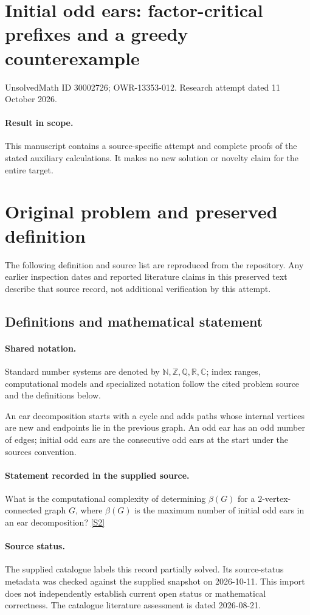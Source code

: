 \documentclass[11pt]{article}
\begin{document}
\section*{Initial odd ears: factor-critical prefixes and a greedy counterexample}
\noindent UnsolvedMath ID 30002726; OWR-13353-012. Research attempt dated 11 October 2026.
\paragraph{Result in scope.}This manuscript contains a source-specific attempt and complete proofs of the stated auxiliary calculations. It makes no new solution or novelty claim for the entire target.
\section{Original problem and preserved definition}
The following definition and source list are reproduced from the repository. Any earlier inspection dates and reported literature claims in this preserved text describe that source record, not additional verification by this attempt.
\subsection{Definitions and mathematical statement}

\paragraph{Shared notation.}Standard number systems are denoted by $\mathbb N,\mathbb Z,\mathbb Q,\mathbb R,\mathbb C$; index ranges, computational models and specialized notation follow the cited problem source and the definitions below.


An ear decomposition starts with a cycle and adds paths whose internal vertices are new and endpoints lie in the previous graph. An odd ear has an odd number of edges; initial odd ears are the consecutive odd ears at the start under the source\textquotesingle s convention.
\paragraph{Statement recorded in the supplied source.}
What is the computational complexity of determining $\beta(G)$ for a $2$-vertex-connected graph $G$, where $\beta(G)$ is the maximum number of initial odd ears in an ear decomposition? \href{https://doi.org/10.4171/owr/2014/51}{[S2]}
\paragraph{Source status.}
The supplied catalogue labels this record partially solved. Its source-status metadata was checked against the supplied snapshot on 2026-10-11. This import does not independently establish current open status or mathematical correctness. The catalogue literature assessment is dated 2026-08-21.
\end{document}
